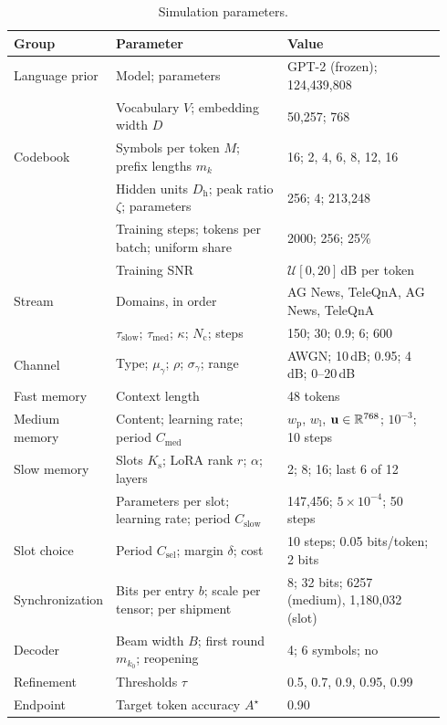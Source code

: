 \begin{table}[!tbp]
\centering
\caption{Simulation parameters.}
\label{tab:params}
\footnotesize
\begin{tabular}{@{}p{0.17\linewidth}p{0.40\linewidth}p{0.37\linewidth}@{}}
\toprule
Group & Parameter & Value \\
\midrule
Language prior & Model; parameters & GPT-2 (frozen); 124,439,808 \\
 & Vocabulary $V$; embedding width $D$ & 50,257; 768 \\
Codebook & Symbols per token $M$; prefix lengths $m_k$ & 16; 2, 4, 6, 8, 12, 16 \\
 & Hidden units $D_\mathrm{h}$; peak ratio $\zeta$; parameters & 256; 4; 213,248 \\
 & Training steps; tokens per batch; uniform share & 2000; 256; 25\% \\
 & Training SNR & $\mathcal{U}[0,20]$\,dB per token \\
Stream & Domains, in order & AG News, TeleQnA, AG News, TeleQnA \\
 & $\tau_\mathrm{slow}$; $\tau_\mathrm{med}$; $\kappa$; $N_\mathrm{c}$; steps & 150; 30; 0.9; 6; 600 \\
Channel & Type; $\mu_\gamma$; $\rho$; $\sigma_\gamma$; range & AWGN; 10\,dB; 0.95; 4\,dB; 0--20\,dB \\
Fast memory & Context length & 48 tokens \\
Medium memory & Content; learning rate; period $C_\mathrm{med}$ & $w_\mathrm{p}$, $w_\mathrm{l}$, $\mathbf{u}\in\mathbb{R}^{768}$; $10^{-3}$; 10 steps \\
Slow memory & Slots $K_\mathrm{s}$; LoRA rank $r$; $\alpha$; layers & 2; 8; 16; last 6 of 12 \\
 & Parameters per slot; learning rate; period $C_\mathrm{slow}$ & 147,456; $5\times10^{-4}$; 50 steps \\
Slot choice & Period $C_\mathrm{sel}$; margin $\delta$; cost & 10 steps; 0.05 bits/token; 2 bits \\
Synchronization & Bits per entry $b$; scale per tensor; per shipment & 8; 32 bits; 6257 (medium), 1,180,032 (slot) \\
Decoder & Beam width $B$; first round $m_{k_0}$; reopening & 4; 6 symbols; no \\
Refinement & Thresholds $\tau$ & 0.5, 0.7, 0.9, 0.95, 0.99 \\
Endpoint & Target token accuracy $A^\star$ & 0.90 \\
\bottomrule
\end{tabular}
\end{table}


